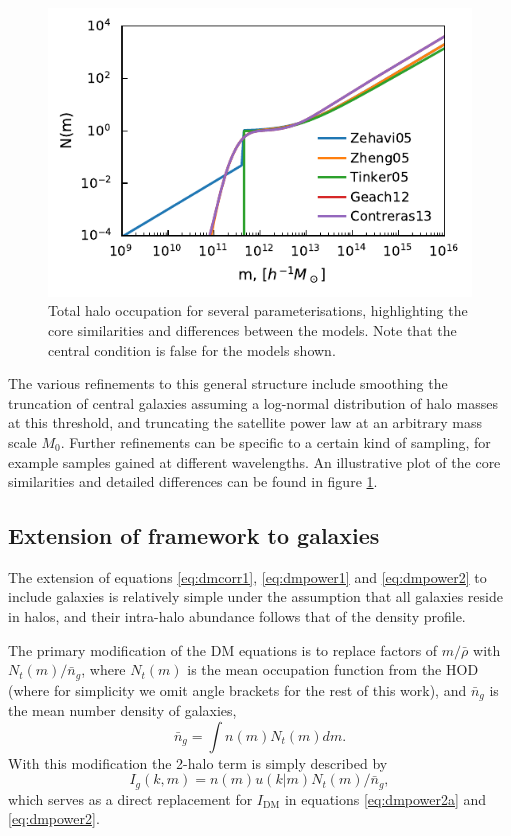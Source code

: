 \documentclass[5p,aas_macros]{elsarticle}
\begin{document}
\begin{figure}
\centering
\includegraphics[width=\linewidth]{figures/hod_models.pdf} 
\caption[Halo occupation for several parameterisations]{Total halo occupation for several parameterisations, highlighting the core similarities and differences between the models. Note that the central condition is false for the models shown.}
\label{fig:hod}	
\end{figure}

The various refinements to this general structure include smoothing the truncation of central galaxies assuming a log-normal distribution of halo masses at this threshold, and truncating the satellite power law at an arbitrary mass scale $M_0$. Further refinements can be specific to a certain kind of sampling, for example samples gained at different wavelengths. An illustrative plot of the core similarities and detailed differences can be found in figure \ref{fig:hod}.



\subsection{Extension of framework to galaxies}
\label{sec:theory-gal:framework}
The extension of equations \ref{eq:dmcorr1}, \ref{eq:dmpower1} and \ref{eq:dmpower2} to include galaxies is relatively simple under the assumption that all galaxies reside in halos, and their intra-halo abundance follows that of the density profile. 

The primary modification of the DM equations is to replace factors of $m/\bar{\rho}$ with $N_t(m)/\bar{n}_g$, where $N_t(m)$ is the mean occupation function from the HOD (where for simplicity we omit angle brackets for the rest of this work), and $\bar{n}_g$ is the mean number density of galaxies,
\begin{equation}
    \label{eq:meandens}
 \bar{n}_g = \int n(m)N_t(m) dm.
\end{equation}
With this modification the 2-halo term is simply described by
\begin{equation}
    I_g(k,m) = n(m) u(k|m) N_t(m)/\bar{n}_g,
\end{equation}
which serves as a direct replacement for $I_\text{DM}$ in equations \ref{eq:dmpower2a} and \ref{eq:dmpower2}.
\end{document}
